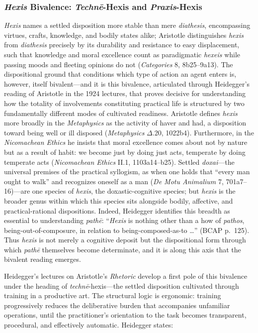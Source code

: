 \documentclass{article}
\begin{document}

\subsubsection*{\textit{Hexis} Bivalence: \textit{Techn\=e}-Hexis and \textit{Praxis}-Hexis}

\textit{Hexis} names a settled disposition more stable than mere \textit{diathesis}, encompassing virtues, crafts, knowledge, and bodily states alike; Aristotle distinguishes \textit{hexis} from \textit{diathesis} precisely by its durability and resistance to easy displacement, such that knowledge and moral excellence count as paradigmatic \textit{hexeis} while passing moods and fleeting opinions do not (\textit{Categories} 8, 8b25--9a13). The dispositional ground that conditions which type of action an agent enters is, however, itself bivalent---and it is this bivalence, articulated through Heidegger's reading of Aristotle in the 1924 lectures, that proves decisive for understanding how the totality of involvements constituting practical life is structured by two fundamentally different modes of cultivated readiness. Aristotle defines \textit{hexis} more broadly in the \textit{Metaphysics} as the activity of haver and had, a disposition toward being well or ill disposed (\textit{Metaphysics} $\Delta$.20, 1022b4). Furthermore, in the \textit{Nicomachean Ethics} he insists that moral excellence comes about not by nature but as a result of habit: we become just by doing just acts, temperate by doing temperate acts (\textit{Nicomachean Ethics} II.1, 1103a14--b25). Settled \textit{doxai}---the universal premises of the practical syllogism, as when one holds that ``every man ought to walk'' and recognizes oneself as a man (\textit{De Motu Animalium} 7, 701a7--16)---are one species of \textit{hexis}, the doxastic-cognitive species; but \textit{hexis} is the broader genus within which this species sits alongside bodily, affective, and practical-rational dispositions. Indeed, Heidegger identifies this breadth as essential to understanding \textit{pathē}: ``\textit{Hexis} is nothing other than a how of \textit{pathos}, being-out-of-composure, in relation to being-composed-as-to \ldots'' (BCAP p.~125). Thus \textit{hexis} is not merely a cognitive deposit but the dispositional form through which \textit{pathē} themselves become determinate, and it is along this axis that the bivalent reading emerges.

Heidegger's lectures on Aristotle's \textit{Rhetoric} develop a first pole of this bivalence under the heading of \textit{techn\=e}-hexis---the settled disposition cultivated through training in a productive art. The structural logic is ergonomic: training progressively reduces the deliberative burden that accompanies unfamiliar operations, until the practitioner's orientation to the task becomes transparent, procedural, and effectively automatic. Heidegger states:
\end{document}
